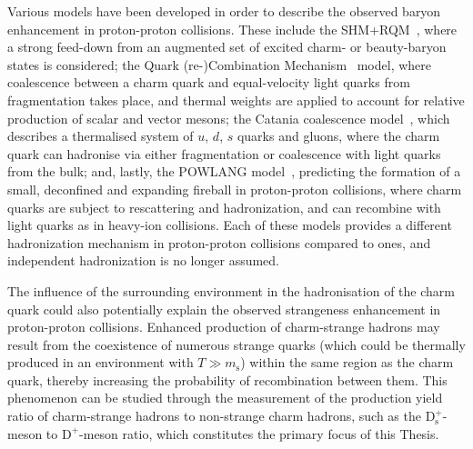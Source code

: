 Various models have been developed in order to describe the observed baryon enhancement in proton-proton collisions. These include the SHM+RQM~\cite{He:2019tik,He:2022tod}, where a strong feed-down from an augmented set of excited charm- or beauty-baryon states is considered; the Quark (re-)Combination Mechanism~\cite{Song:2018tpv} model, where coalescence between a charm quark and equal-velocity light quarks from fragmentation takes place, and thermal weights are applied to account for relative production of scalar and vector mesons; the Catania coalescence model~\cite{Minissale:2020bif}, which describes a thermalised system of $u$, $d$, $s$ quarks and gluons, where the charm quark can hadronise via either fragmentation or coalescence with light quarks from the bulk; and, lastly, the POWLANG model~\cite{Beraudo:2023nlq}, predicting the formation of a small, deconfined and expanding fireball in proton-proton collisions, where charm quarks are subject to rescattering and hadronization, and can recombine with light quarks as in heavy-ion collisions. Each of these models provides a different hadronization mechanism in proton-proton collisions compared to \ee ones, and independent hadronization is no longer assumed. 

The influence of the surrounding environment in the hadronisation of the charm quark could also potentially explain the observed strangeness enhancement in proton-proton collisions. Enhanced production of charm-strange hadrons may result from the coexistence of numerous strange quarks (which could be thermally produced in an environment with $T \gg m_\mathrm{s}$) within the same region as the charm quark, thereby increasing the probability of recombination between them. This phenomenon can be studied through the measurement of the production yield ratio of charm-strange hadrons to non-strange charm hadrons, such as the $\mathrm{D_s^+}$-meson to $\mathrm{D^+}$-meson ratio, which constitutes the primary focus of this Thesis.

